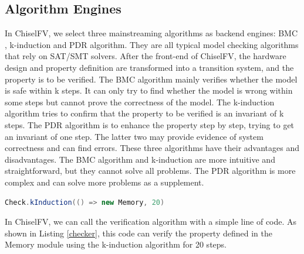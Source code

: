 \documentclass[conference]{IEEEtran}
\theoremstyle{definition}
\begin{document}
\subsection{Algorithm Engines}
In ChiselFV, we select three mainstreaming algorithms as backend engines: BMC \cite{biere1999symbolic}, k-induction \cite{sheeran2000checking} and PDR \cite{bradley2011sat} algorithm. 
They are all typical model checking algorithms that rely on SAT/SMT solvers. After the front-end of ChiselFV, the hardware design and property definition are transformed into a transition system, and the property is to be verified. The BMC algorithm mainly verifies whether the model is safe within k steps. It can only try to find whether the model is wrong within some steps but cannot prove the correctness of the model. The k-induction algorithm tries to confirm that the property to be verified is an invariant of k steps. The PDR algorithm is to enhance the property step by step, trying to get an invariant of one step. The latter two may provide evidence of system correctness and can find errors. These three algorithms have their advantages and disadvantages. The BMC algorithm and k-induction are more intuitive and straightforward, but they cannot solve all problems. The PDR algorithm is more complex and can solve more problems as a supplement.

\begin{lstlisting}[language=scala, caption={A Code Clip to Call Formal Verification}, label=checker]
Check.kInduction(() => new Memory, 20)
\end{lstlisting}

In ChiselFV, we can call the verification algorithm with a simple line of code. As shown in Listing \ref{checker}, this code can verify the property defined in the Memory module using the k-induction algorithm for 20 steps.
\end{document}
